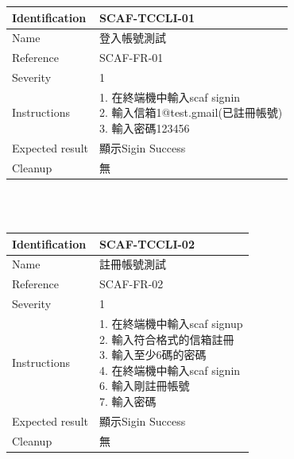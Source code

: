 \documentclass{report}
\begin{document}
\begin{tabularx}{\textwidth}{
  |p{}%
  |p{}|%
  }
  \hline
  \centering Identification &  SCAF-TCCLI-01 \\
  \hline
  \centering Name & 登入帳號測試 \\
  \hline
  \centering Reference & SCAF-FR-01 \\
  \hline
  \centering Severity & 1 \\
  \hline
  \centering Instructions & 
  \makecell[l]{
    1. 在終端機中輸入scaf signin  \\
    2. 輸入信箱1@test.gmail(已註冊帳號) \\
    3. 輸入密碼123456 \\
  }\\
  \hline
  \centering Expected result & 顯示Sigin Success \\
  \hline
  \centering Cleanup & 無 \\
  \hline
\end{tabularx}
\\
\newline
\\

\begin{tabularx}{\textwidth}{
  |p{}%
  |p{}|%
  }
  \hline
  \centering Identification &  SCAF-TCCLI-02 \\
  \hline
  \centering Name & 註冊帳號測試 \\
  \hline
  \centering Reference & SCAF-FR-02 \\
  \hline
  \centering Severity & 1 \\
  \hline
  \centering Instructions & 
  \makecell[l]{
    1. 在終端機中輸入scaf signup\\
    2. 輸入符合格式的信箱註冊 \\
    3. 輸入至少6碼的密碼 \\
    4. 在終端機中輸入scaf signin  \\
    6. 輸入剛註冊帳號 \\
    7. 輸入密碼 \\
  }\\
  \hline
  \centering Expected result & 顯示Sigin Success \\
  \hline
  \centering Cleanup & 無 \\
  \hline
\end{tabularx}
\\
\newline
\\
\end{document}
